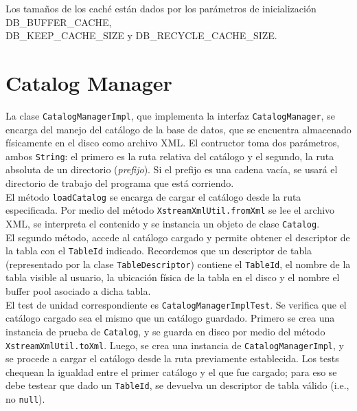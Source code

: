 \documentclass[a4paper,10pt]{article}
\begin{document}
Los tamaños de los caché están dados por los parámetros de inicialización DB\_BUFFER\_CACHE,\\DB\_KEEP\_CACHE\_SIZE y DB\_RECYCLE\_CACHE\_SIZE.\\


\newpage

\section{Catalog Manager}

La clase \texttt{CatalogManagerImpl}, que implementa la interfaz \texttt{CatalogManager}, se encarga del manejo del catálogo de la base de datos, que se encuentra almacenado físicamente en el disco como archivo XML. El contructor toma dos parámetros, ambos \texttt{String}: el primero es la ruta relativa del catálogo y el segundo, la ruta absoluta de un directorio (\textit{prefijo}). Si el prefijo es una cadena vacía, se usará
el directorio de trabajo del programa que está corriendo.\\

El método \texttt{loadCatalog} se encarga de cargar el catálogo desde la ruta especificada. Por medio del método \texttt{XstreamXmlUtil.fromXml} se lee el archivo XML, se interpreta el contenido y se instancia un objeto de clase \texttt{Catalog}.\\

El segundo método, accede al catálogo cargado y permite obtener el descriptor de la tabla con el \texttt{TableId} indicado. Recordemos que un descriptor de tabla (representado por la clase \texttt{TableDescriptor}) contiene el \texttt{TableId}, el nombre de la tabla visible al usuario, la ubicación física de la tabla en el disco y el nombre el buffer pool asociado a dicha tabla.\\

El test de unidad correspondiente es \texttt{CatalogManagerImplTest}. Se verifica que el catálogo cargado sea el mismo que un catálogo guardado. Primero se crea una instancia de prueba de \texttt{Catalog}, y se guarda en disco por medio del método \texttt{XstreamXmlUtil.toXml}. Luego, se crea una instancia de \texttt{CatalogManagerImpl}, y se procede a cargar el catálogo desde la ruta previamente establecida. Los tests chequean la igualdad entre el primer catálogo y el que fue
cargado; para eso se debe testear que dado un \texttt{TableId}, se devuelva un descriptor de tabla válido (i.e., no \texttt{null}). \\
\end{document}
